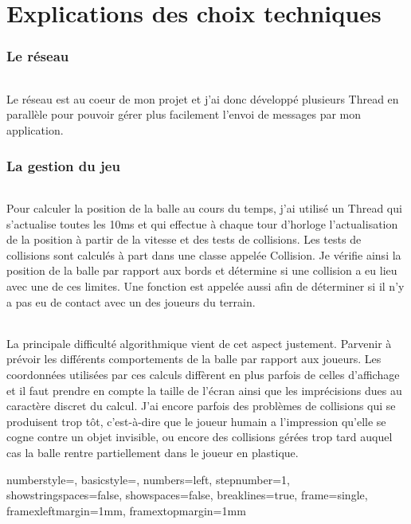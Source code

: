 \documentclass[a4paper,12pt]{report}
\begin{document}
\part{Explications des choix techniques}
\section{Le réseau}
\paragraph{}
Le réseau est au coeur de mon projet et j'ai donc développé plusieurs Thread en parallèle pour pouvoir gérer plus facilement l'envoi de messages par mon application.
\section{La gestion du jeu}
\paragraph{}
Pour calculer la position de la balle au cours du temps, j'ai utilisé un Thread qui s'actualise toutes les 10ms et qui effectue à chaque tour d'horloge
l'actualisation de la position à partir de la vitesse et des tests de collisions. Les tests de collisions sont calculés à part dans une classe appelée Collision.
Je vérifie ainsi la position de la balle par rapport aux bords et détermine si une collision a eu lieu avec une de ces limites. Une fonction est appelée aussi afin de
déterminer si il n'y a pas eu de contact avec un des joueurs du terrain.
\paragraph{}
La principale difficulté algorithmique vient de cet aspect justement. Parvenir à prévoir les différents comportements de la balle par rapport aux
joueurs. Les coordonnées utilisées par ces calculs diffèrent en plus parfois de celles d'affichage et il faut prendre en compte la taille de l'écran ainsi que les imprécisions dues au caractère discret du calcul. J'ai encore parfois des problèmes de collisions qui se produisent trop tôt, c'est-à-dire que le joueur humain a l'impression qu'elle se cogne contre un objet invisible, ou encore des collisions gérées trop tard auquel cas la balle rentre partiellement dans le joueur en plastique.

\lstset
{
	numberstyle=\footnotesize,
	basicstyle=\ttfamily\footnotesize,
	numbers=left,
	stepnumber=1,
	showstringspaces=false,
	showspaces=false,
	breaklines=true,
	frame=single,
	framexleftmargin=1mm,
	framextopmargin=1mm
}
\end{document}
